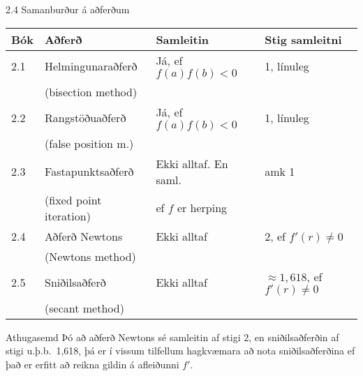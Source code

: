 \begin{frame}{2.4 Samanburður á aðferðum}

{\small
\begin{block}{}
 \begin{table}[h]
    \begin{tabular}{|l|l|l|l|}
        \hline
        Bók            & Aðferð         & Samleitin           & Stig samleitni                    \\ \hline
        2.1 & Helmingunaraðferð      & Já, ef $f(a)f(b)<0$ & 1, línuleg                        \\ 
	& (bisection method) & & \\\hline 
        2.2 & Rangstöðuaðferð   & Já, ef $f(a)f(b)<0$ & 1, línuleg                        \\ 
        & (false position m.) && \\\hline 
	2.3 & Fastapunktsaðferð  & Ekki alltaf. En saml.         & amk 1              \\ 
        & (fixed point iteration) & ef $f$ er herping& \\\hline 
	2.4 & Aðferð Newtons  & Ekki alltaf         & 2, ef $f'(r)\neq 0$               \\ 
        & (Newtons method) & & \\\hline 
	2.5 & Sniðilsaðferð      & Ekki alltaf         & $\approx 1,618$, ef $f'(r)\neq 0$ \\
	& (secant method) & & \\
        \hline
    \end{tabular}
\end{table}
\end{block}
}

 \pause

\begin{block}{Athugasemd}
 Þó að aðferð Newtons sé samleitin af stigi 2, en sniðilsaðferðin
af stigi u.þ.b.~1,618, þá er í vissum tilfellum hagkvæmara að nota
sniðilsaðferðina ef það er erfitt að reikna gildin á afleiðunni
$f'$. 
\end{block}

\end{frame}
 


